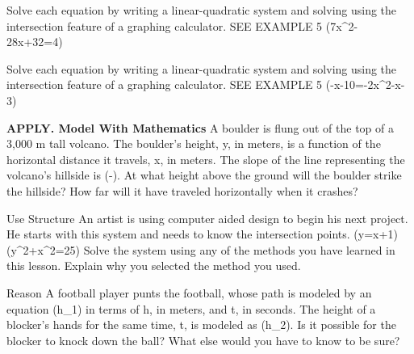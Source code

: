 \documentclass{article}
\newenvironment{practice}[2]{}{}        %
\newcommand{\answer}[1]{}               %
\newcommand{\placeholder}[2]{}          %
\begin{document}
\begin{practice}{22}{1}
Solve each equation by writing a linear-quadratic system and solving using the intersection feature of a graphing calculator. SEE EXAMPLE 5
(7x^2-28x+32=4)
\answer{(x=2)}
\end{practice}
\begin{practice}{23}{1}
Solve each equation by writing a linear-quadratic system and solving using the intersection feature of a graphing calculator. SEE EXAMPLE 5
(-x-10=-2x^2-x-3)
\answer{(x\approx-1.53), (x\approx2.28)}
\end{practice}
\begin{practice}{24}{2}
\textbf{APPLY. Model With Mathematics} A boulder is flung out of the top of a 3,000 m tall volcano. The boulder's height, y, in meters, is a function of the horizontal distance it travels, x, in meters. The slope of the line representing the volcano's hillside is (-). At what height above the ground will the boulder strike the hillside? How far will it have traveled horizontally when it crashes?
\placeholder{illustration}{Erupting volcano with flying boulders; blue curved trajectory and blue downward hillside line. Callout on trajectory (y=-\frac{1}{1,000}x^2-\frac{1}{6}x+3,000); hillside callout slope (=-\frac{5}{3}). No axes or tick labels.}
\answer{The boulder will be 500 meters above the ground when it strikes the hillside, having traveled 1,500 meters horizontally.}
\end{practice}
\begin{practice}{25}{2}
Use Structure An artist is using computer aided design to begin his next project. He starts with this system and needs to know the intersection points.
(y=x+1)
(y^2+x^2=25)
Solve the system using any of the methods you have learned in this lesson. Explain why you selected the method you used.
\answer{(-4,-3) and (3,4); I substituted (x+1) for y in the second equation, solved for x, then found the corresponding y values. This method was straightforward because the quadratic equation was factorable.}
\end{practice}
\begin{practice}{26}{2}
Reason A football player punts the football, whose path is modeled by an equation (h_1) in terms of h, in meters, and t, in seconds. The height of a blocker's hands for the same time, t, is modeled as (h_2). Is it possible for the blocker to knock down the ball? What else would you have to know to be sure?
\placeholder{illustration}{Football field with yellow-uniformed player punting at left and blue-uniformed blocker jumping at right. Ball callout (h_1=-4.9t^2+18.24t+0.8); blocker callout (h_2=-1.43t+4.26). Field marking 50.}
\answer{Yes; If you knew how far away the player was standing, you could be sure.}
\end{practice}
\end{document}
